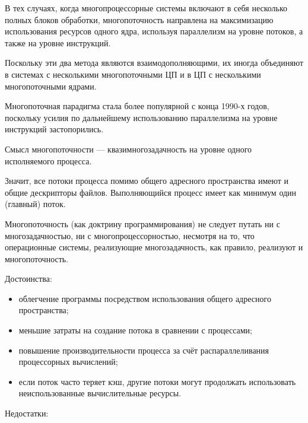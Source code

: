 \documentclass[12pt]{report}
\begin{document}
В тех случаях, когда многопроцессорные системы включают в себя несколько полных блоков обработки, многопоточность направлена на максимизацию использования ресурсов одного ядра, используя параллелизм на уровне потоков, а также на уровне инструкций.

Поскольку эти два метода являются взаимодополняющими, их иногда объединяют в системах с несколькими многопоточными ЦП и в ЦП с несколькими многопоточными ядрами.


Многопоточная парадигма стала более популярной с конца 1990-х годов, поскольку усилия по дальнейшему использованию параллелизма на уровне инструкций застопорились.

Смысл многопоточности — квазимногозадачность на уровне одного исполняемого процесса.

Значит, все потоки процесса помимо общего адресного пространства имеют и общие дескрипторы файлов. Выполняющийся процесс имеет как минимум один (главный) поток.


Многопоточность (как доктрину программирования) не следует путать ни с многозадачностью, ни с многопроцессорностью, несмотря на то, что операционные системы, реализующие многозадачность, как правило, реализуют и многопоточность.


Достоинства:

\begin{itemize}

	\item облегчение программы посредством использования общего адресного пространства;

	\item меньшие затраты на создание потока в сравнении с процессами;

	\item повышение производительности процесса за счёт распараллеливания процессорных вычислений;

	\item если поток часто теряет кэш, другие потоки могут продолжать использовать неиспользованные вычислительные ресурсы.

\end{itemize}


Недостатки:
\end{document}
